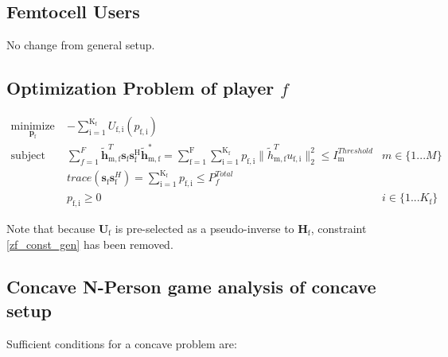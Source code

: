 \documentclass[12pt,a4paper]{report}
\begin{document}
\subsection{Femtocell Users}
No change from general setup.



\subsection{Optimization Problem of player $f$}\label{conproblem}


	\begin{subequations}
	\label{optim}
	\begin{align}
	    \underset{\mathbf{p}_{\mathrm{f}} }{\text{minimize}} \;
	    & - \sum_{\mathrm{i=1}}^{\mathrm{K_f}}
    	U_{\mathrm{f,i}}(p_{\mathrm{f,i}}) \label{player_opt_c} \\
	    \text{subject to} \; &
	  \sum^F_{f=1} \mathbf{\tilde{h}}_{\mathrm{m,f}}^T  \mathbf{s}_{\mathrm{f}} 						
	\mathbf{s_{\mathrm{f}}^{\mathrm{H}}} \mathbf{\tilde{h}_{\mathrm{m,f}}^*} 
	=
	\sum_{\mathrm{f=1}}^{\mathrm{F}}	\sum_{\mathrm{i=1}}^{\mathrm{K_f}}
	p_{\mathrm{f,i}}\|\tilde{h}_{\mathrm{m,f}}^T u_{\mathrm{f,i}}\|^2_2
	\leq I^{Threshold}		
	_{\mathrm{m}} & m \in \{1 ...M\} 
		\label{interference_const_c}\\
        & trace(\mathbf{s}_\mathrm{f}\mathbf{s}_\mathrm{f}^H) =
        	\sum_{\mathrm{i=1}}^{\mathrm{K_{\mathrm{f}}}} p_{\mathrm{f,i}}
	   \leq P^{Total}_{f}  \label{power_const_c}\\
        & p_{\mathrm{f,i}} \geq 0 &  i \in \{1 ...K_{\mathrm{f}}\} \label{pos_power_const_c}
	\end{align}
	\end{subequations}

Note that because $\mathbf{U}_{\mathrm{f}}$ is pre-selected as a pseudo-inverse to  $\mathbf{H_\mathrm{f}}$, constraint \eqref{zf_const_gen} has been removed.
\subsection{Concave N-Person game analysis of concave setup}

Sufficient conditions for a concave problem are:
\end{document}
